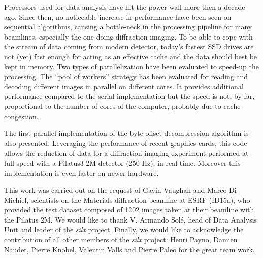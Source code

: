\documentclass[preprint]{iucr}              %
\begin{document}
Processors used for data analysis have hit the power wall more then
a  decade ago.
Since then, no noticeable increase in performance have been seen on
sequential algorithms, causing a bottle-neck in the processing
pipeline for many beamlines, especially the one doing diffraction imaging.
To be able to cope with the stream of data coming from modern detector,
today's fastest SSD drives are not (yet) fast  enough for acting as an
effective cache and the data should best be kept in memory.
Two types of parallelization have been evaluated to speed-up the processing.
The ``pool of workers'' strategy has been evaluated for reading and decoding
different images  in parallel on different cores.
It provides additional performance compared to the serial implementation but
the speed is not, by far, proportional to the number of cores of the computer,
probably due to cache congestion.

The first parallel implementation of the byte-offset decompression 
algorithm is also presented. 
Leveraging the performance of recent graphics cards, this code allows the reduction
of data for a diffraction imaging experiment performed at full speed with
a Pilatus3 2M detector (250 Hz), in real time.
Moreover this implementation is even faster on newer hardware. 

 
This work was carried out on the request of Gavin Vaughan and Marco Di
Michiel, scientists on the Materials diffraction beamline at ESRF (ID15a), who
provided the test dataset composed of 1202 images taken at their beamline with
the Pilatus 2M.
We would like to thank V. Armando Solé, head of Data Analysis Unit and leader
of the \textit{silx} project. 
Finally, we would like to acknowledge the contribution of all other members
of the \textit{silx} project:
Henri Payno, Damien Naudet, Pierre Knobel, Valentin Valls and
Pierre Paleo for the great team work.



\end{document}
